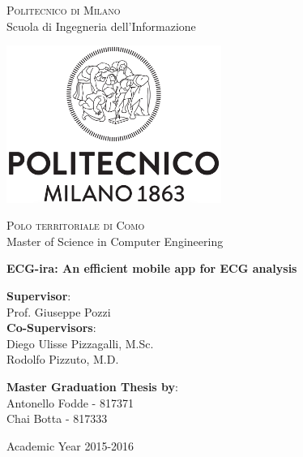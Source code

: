 \thispagestyle{empty}

\begin{center}

	\textsc{Politecnico di Milano}\\
 	Scuola di Ingegneria dell'Informazione\\  

 	\par\vskip 0.2cm

 	\includegraphics[width=7cm]{figures/polimi_logo_bw.png}\\
  
 	\par\vskip 0.2cm  
  
  	\textsc{Polo territoriale di Como}\\
  	Master of Science in Computer Engineering\\  


  	\par\vskip 2cm
  	
\LARGE{ \bf	ECG-ira: An efficient mobile app for ECG analysis}


		
\end{center}

\par\vskip 1.5cm

\begin{flushleft}
\textbf{Supervisor}:\\
Prof. Giuseppe Pozzi\\

\textbf{Co-Supervisors}:\\
Diego Ulisse Pizzagalli, M.Sc.\\
Rodolfo Pizzuto, M.D.
\end{flushleft}

\par\vskip 1cm

\begin{flushleft}
  	\textbf{Master Graduation Thesis by}: \\
  	Antonello Fodde - 817371 \\ 
  	Chai Botta - 817333 \\  
\end{flushleft}

\par\vskip 1cm

\begin{center}
 	Academic Year 2015-2016
\end{center}




